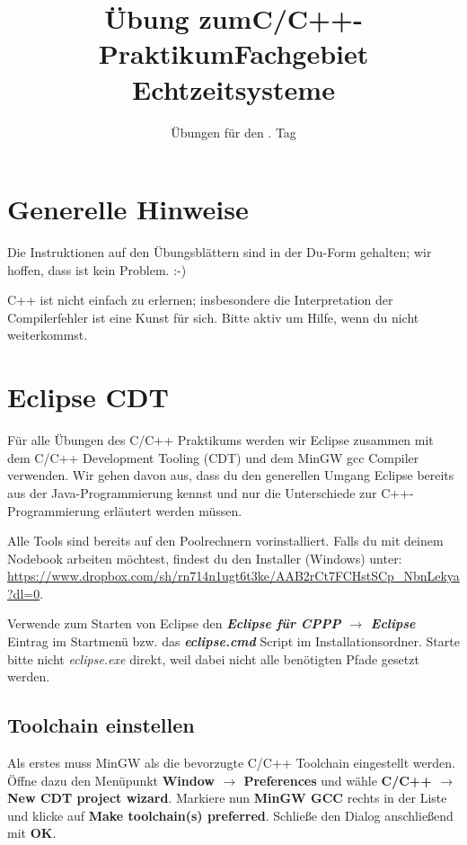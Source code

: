 \documentclass[
  accentcolor=tud1c,	%
  colorbacktitle,		%
  inverttitle,			%
  german,				%
  twoside
]{tudexercise}
\title{Übung zum\linebreak[1]C/C++-Praktikum\linebreak[1] Fachgebiet Echtzeitsysteme}
\subtitle{Übungen für den \tag{}. Tag}
\newcommand{\tag}{1}
\begin{document}
\begin{examheader}
	\textmb{Übung zum C/C++-Praktikum - Tag \tag{}}
\end{examheader}
\maketitle 

\vspace{5mm}

\section{Generelle Hinweise}

Die Instruktionen auf den Übungsblättern sind in der Du-Form gehalten; wir hoffen, dass ist kein Problem. :-)

C++ ist nicht einfach zu erlernen; insbesondere die Interpretation der Compilerfehler ist eine Kunst für sich.
Bitte aktiv um Hilfe, wenn du nicht weiterkommst.


\section{Eclipse CDT}

Für alle Übungen des C/C++ Praktikums werden wir Eclipse zusammen mit dem C/C++ Development Tooling (CDT) und dem MinGW gcc Compiler verwenden.
Wir gehen davon aus, dass du den generellen Umgang Eclipse bereits aus der Java-Programmierung kennst und nur die Unterschiede zur C++-Programmierung erläutert werden müssen.

Alle Tools sind bereits auf den Poolrechnern vorinstalliert.
Falls du mit deinem Nodebook arbeiten möchtest, findest du den Installer (Windows) unter: \url{https://www.dropbox.com/sh/rn714n1ugt6t3ke/AAB2rCt7FCHstSCp_NbnLekya?dl=0}.

Verwende zum Starten von Eclipse den \textbf{\emph{Eclipse für CPPP $\rightarrow$ Eclipse}} Eintrag im Startmenü bzw. das \textbf{\emph{eclipse.cmd}} Script im Installationsordner.
Starte bitte nicht \emph{eclipse.exe} direkt, weil dabei nicht alle benötigten Pfade gesetzt werden.

\subsection{Toolchain einstellen}

Als erstes muss MinGW als die bevorzugte C/C++ Toolchain eingestellt werden.
Öffne dazu den Menüpunkt \textbf{Window $\rightarrow$   Preferences} und wähle \textbf{C/C++ $\rightarrow$  New CDT project wizard}.
Markiere nun \textbf{MinGW GCC} rechts in der Liste und klicke auf \textbf{Make toolchain(s) preferred}.
Schließe den Dialog anschließend mit \textbf{OK}.
\end{document}
